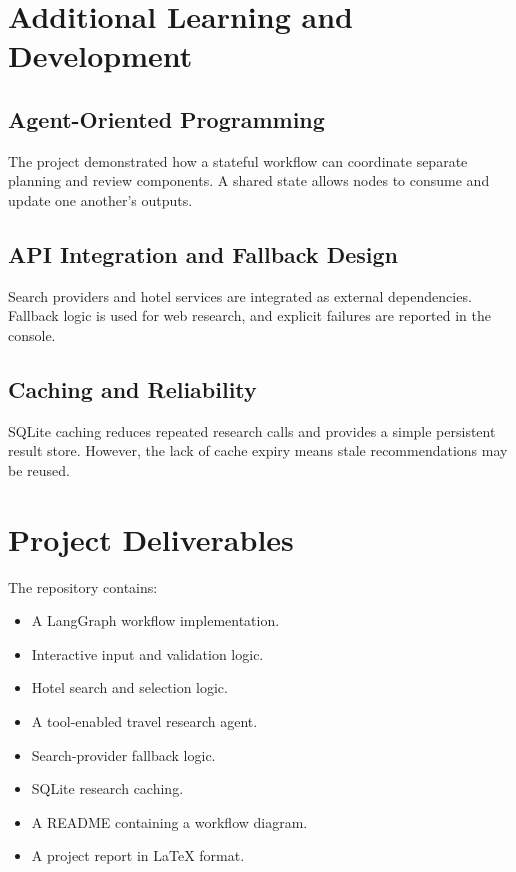 \documentclass[12pt,a4paper]{report}
\begin{document}
\section{Additional Learning and Development}
\label{sec:additional-learning}

\subsection{Agent-Oriented Programming}
\label{subsec:agent-oriented}
The project demonstrated how a stateful workflow can coordinate separate planning and review
components. A shared state allows nodes to consume and update one another's outputs.

\subsection{API Integration and Fallback Design}
\label{subsec:api-fallback}
Search providers and hotel services are integrated as external dependencies. Fallback logic is
used for web research, and explicit failures are reported in the console.

\subsection{Caching and Reliability}
\label{subsec:caching-reliability}
SQLite caching reduces repeated research calls and provides a simple persistent result store.
However, the lack of cache expiry means stale recommendations may be reused.

\section{Project Deliverables}
\label{sec:project-deliverables}
The repository contains:
\begin{itemize}
    \item A LangGraph workflow implementation.
    \item Interactive input and validation logic.
    \item Hotel search and selection logic.
    \item A tool-enabled travel research agent.
    \item Search-provider fallback logic.
    \item SQLite research caching.
    \item A README containing a workflow diagram.
    \item A project report in LaTeX format.
\end{itemize}
\end{document}
